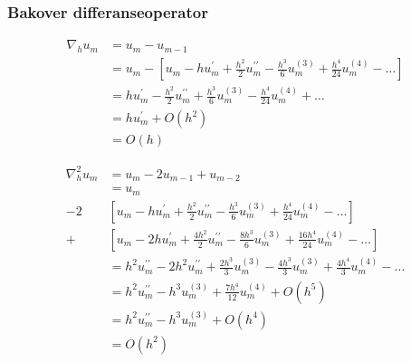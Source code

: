 \subsubsection{Bakover differanseoperator}
\begin{align*}
    \nabla_h u_m & = u_m - u_{m-1}                                                                                                                            \\
                 & = u_m - \left[u_m - h u_m^{\prime} + \frac{h^2}{2} u_m^{\prime\prime} - \frac{h^3}{6} u_m^{(3)} + \frac{h^4}{24} u_m^{(4)} - \hdots\right] \\
                 & = h u_m^{\prime} - \frac{h^2}{2} u_m^{\prime\prime} + \frac{h^3}{6} u_m^{(3)} - \frac{h^4}{24} u_m^{(4)} + \hdots                          \\
                 & = h u_m^{\prime} + O(h^2)                                                                                                                  \\
                 & = O(h)
\end{align*}

\begin{align*}
    \nabla_h^2 u_m & = u_m - 2u_{m-1} + u_{m-2}                                                                                                                   \\
                   & = u_m                                                                                                                                        \\
    - 2            & \left[u_m - h u_m^{\prime} + \frac{h^2}{2} u_m^{\prime\prime} - \frac{h^3}{6} u_m^{(3)} + \frac{h^4}{24} u_m^{(4)} - \hdots\right]           \\
    +              & \left[u_m - 2h u_m^{\prime} + \frac{4h^2}{2} u_m^{\prime\prime} - \frac{8h^3}{6} u_m^{(3)} + \frac{16h^4}{24} u_m^{(4)} - \hdots\right]      \\
                   & = h^2 u_m^{\prime\prime} - 2h^2 u_m^{\prime\prime} + \frac{2h^3}{3} u_m^{(3)} - \frac{4h^3}{3} u_m^{(3)} + \frac{4h^4}{3} u_m^{(4)} - \hdots \\
                   & = h^2 u_m^{\prime\prime} - h^3 u_m^{(3)} + \frac{7h^4}{12} u_m^{(4)} + O(h^5)                                                                \\
                   & = h^2 u_m^{\prime\prime} - h^3 u_m^{(3)} + O(h^4)                                                                                            \\
                   & = O(h^2)
\end{align*}

